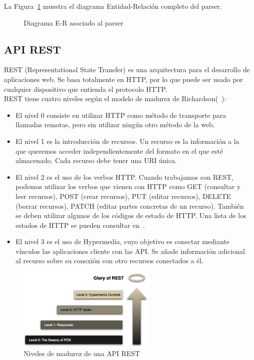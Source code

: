 La Figura~\ref{fig:er-parser} muestra el diagrama Entidad-Relación completo del parser.

\begin{figure}[htb]
\centering
\erparser
\caption{Diagrama E-R asociado al parser}
\label{fig:er-parser}
\end{figure}

\clearpage

\subsection*{API REST}

REST (Representational State Transfer) es una arquitectura para el desarrollo de aplicaciones web. Se basa totalmente en HTTP, por lo que puede ser usado por cualquier dispositivo que entienda el protocolo HTTP.\\

REST tiene cuatro niveles según el modelo de madurez de Richardson(~\cite{richardson}):

\begin{itemize}
\item El nivel 0 consiste en utilizar HTTP como método de transporte para llamadas remotas, pero sin utilizar ningún otro método de la web.

\item El nivel 1 es la introducción de recursos. Un recurso es la información a la que queremos acceder independientemente del formato en el que esté almacenado. Cada recurso debe tener una URI única.

\item El nivel 2 es el uso de los verbos HTTP. Cuando trabajamos con REST, podemos utilizar los verbos que vienen con HTTP como GET (consultar y leer recursos), POST (crear recursos), PUT (editar recursos), DELETE (borrar recursos), PATCH (editar partes concretas de un recurso). También se deben utilizar algunos de los códigos de estado de HTTP. Una lista de los estados de HTTP se pueden consultar en~\cite{http-status}.

\item El nivel 3 es el uso de Hypermedia, cuyo objetivo es conectar mediante vínculos las aplicaciones cliente con las API. Se añade información adicional al recurso sobre su conexión con otro recursos conectados a él.
\end{itemize}

\begin{figure}[htb]
\centering
\includegraphics[width=0.6\textwidth]{imagenes/rest-levels}
\caption{Niveles de madurez de una API REST}
\label{fig:niveles-api-rest}
\end{figure}

